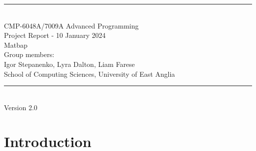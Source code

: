 \documentclass[a4paper, oneside, 11pt]{report}
\begin{document}
\begin{titlepage}
\begin{center}
\rule{12cm}{1mm} \\
\vspace{1cm}
{\large  CMP-6048A/7009A Advanced Programming} %
\vspace{7.5cm}
\\{\Large Project Report - 10 January 2024}
\vspace{1.5cm}
\\{\LARGE Matbap} %
\vspace{1.0cm}
\\{\Large Group members: \\ Igor Stepanenko, Lyra Dalton, Liam Farese\ }
\vspace{10.0cm}
\\{\large School of Computing Sciences, University of East Anglia}
\\ \rule{12cm}{0.5mm}
\\ \hspace{8.5cm} {\large Version 2.0}
\end{center}
\end{titlepage}


\setcounter{page}{1}


\begin{abstract}
Please replace this section with your own abstract. An abstract is a brief summary (maximum 250 words) of your entire project. It should cover your objectives, your methodologies used, a brief developmental history, your final results, in particular covering the optional tasks, and a discussion and conclusion. You do not cover the literature or background in an abstract nor should you use abbreviations or acronyms. The remainder of this report template has clear chapter titles and we suggest to stick to these although you can organise your material inside each chapter to your own preferences. A guideline in size is approximately 3,500 words (not including abstract, captions and references) but no real limit on figures, tables, diagrams, pseudo-code etc.
\end{abstract}

\chapter{Introduction}
\label{chap:intro}
\end{document}
